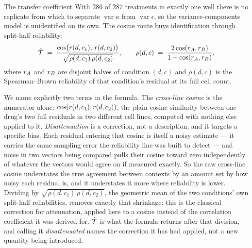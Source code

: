 \begin{defn}{The transfer coefficient}
With $\num{286}$ of $\num{287}$ treatments in exactly one well there is
no replicate from which to separate $\operatorname{var}\kappa$ from
$\operatorname{var}\epsilon$, so the variance-components model is unidentified on
its own. The cosine route buys identification through split-half reliability:
\begin{equation}
 \hat{\mathcal{T}} \;=\; \frac{\cos\!\big(r(d,c_1),\, r(d,c_2)\big)}
 {\sqrt{\rho(d,c_1)\,\rho(d,c_2)}},
 \qquad
 \rho(d,c) \;=\; \frac{2\cos(r_A, r_B)}{1 + \cos(r_A, r_B)},
\end{equation}
where $r_A$ and $r_B$ are disjoint halves of condition $(d,c)$ and
$\rho(d,c)$ is the Spearman--Brown reliability of that condition's residual at
its full cell count.
\end{defn}

We name explicitly two terms in the formula. The
\emph{cross-line cosine} is the numerator alone: $\cos(r(d,c_1), r(d,c_2))$,
the plain cosine similarity between one drug's two full residuals in two different
cell lines, computed with nothing else applied to it. \emph{Disattenuation} is a
correction, not a description, and it targets a specific bias. Each residual
entering that cosine is itself a noisy estimate --- it carries the same sampling
error the reliability line was built to detect --- and noise in two vectors being
compared pulls their cosine toward zero independently of whatever the vectors
would agree on if measured exactly. So the raw cross-line cosine understates the
true agreement between contexts by an amount set by how noisy each residual is,
and it understates it more where reliability is lower. Dividing by
$\sqrt{\rho(d,c_1)\,\rho(d,c_2)}$, the geometric mean of the two conditions' own
split-half reliabilities, removes exactly that shrinkage: this is the classical
correction for attenuation, applied here to a cosine instead of the correlation
coefficient it was derived for. $\hat{\mathcal{T}}$ is what the formula returns after
that division, and calling it \emph{disattenuated} names the correction it has had
applied, not a new quantity being introduced.

